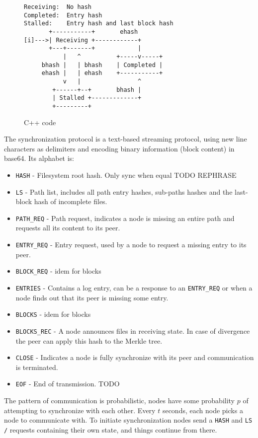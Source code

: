 \documentclass{sig-alternate}
\begin{document}

\begin{figure}
\centering
\begin{BVerbatim}
Receiving:  No hash
Completed:  Entry hash
Stalled:    Entry hash and last block hash
       +-----------+       ehash
[i]--->| Receiving +------------+
       +---+-------+            |
           |   ^          +-----v-----+
     bhash |   | bhash    | Completed |
     ehash |   | ehash    +-----------+
           v   |                ^
        +------+--+       bhash |
        | Stalled +-------------+
        +---------+
\end{BVerbatim}
\caption{C++ code}
\end{figure}

The synchronization protocol is a text-based streaming protocol, using new line characters as delimiters and encoding binary information (block content) in base64. Its alphabet is:

\begin{itemize}
\item \texttt{HASH} - Filesystem root hash. Only sync when equal TODO REPHRASE
\item \texttt{LS} - Path list, includes all path entry hashes, sub-paths hashes and the last-block hash of incomplete files.
\item \texttt{PATH\_REQ} - Path request, indicates a node is missing an entire path and requests all its content to its peer.
\item \texttt{ENTRY\_REQ} - Entry request, used by a node to request a missing entry to its peer.
\item \texttt{BLOCK\_REQ} - idem for blocks
\item \texttt{ENTRIES} - Contains a log entry, can be a response to an \texttt{ENTRY\_REQ} or when a node finds out that its peer is missing some entry.
\item \texttt{BLOCKS} - idem for blocks
\item \texttt{BLOCKS\_REC} - A node announces files in receiving state. In case of divergence the peer can apply this hash to the Merkle tree.
\item \texttt{CLOSE} - Indicates a node is fully synchronize with its peer and communication is terminated.
\item \texttt{EOF} - End of transmission. TODO
\end{itemize}


The pattern of communication is probabilistic, nodes have some probability $p$ of attempting to synchronize with each other. Every $t$ seconds, each node picks a node to communicate with. To initiate synchronization nodes send a \texttt{HASH} and \texttt{LS /} requests containing their own state, and things continue from there.
\end{document}
